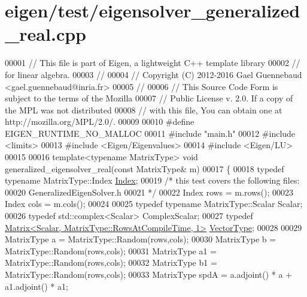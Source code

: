 \hypertarget{eigen_2test_2eigensolver__generalized__real_8cpp_source}{}\section{eigen/test/eigensolver\+\_\+generalized\+\_\+real.cpp}
\label{eigen_2test_2eigensolver__generalized__real_8cpp_source}

\begin{DoxyCode}
00001 \textcolor{comment}{// This file is part of Eigen, a lightweight C++ template library}
00002 \textcolor{comment}{// for linear algebra.}
00003 \textcolor{comment}{//}
00004 \textcolor{comment}{// Copyright (C) 2012-2016 Gael Guennebaud <gael.guennebaud@inria.fr>}
00005 \textcolor{comment}{//}
00006 \textcolor{comment}{// This Source Code Form is subject to the terms of the Mozilla}
00007 \textcolor{comment}{// Public License v. 2.0. If a copy of the MPL was not distributed}
00008 \textcolor{comment}{// with this file, You can obtain one at http://mozilla.org/MPL/2.0/.}
00009 
00010 \textcolor{preprocessor}{#define EIGEN\_RUNTIME\_NO\_MALLOC}
00011 \textcolor{preprocessor}{#include "main.h"}
00012 \textcolor{preprocessor}{#include <limits>}
00013 \textcolor{preprocessor}{#include <Eigen/Eigenvalues>}
00014 \textcolor{preprocessor}{#include <Eigen/LU>}
00015 
00016 \textcolor{keyword}{template}<\textcolor{keyword}{typename} MatrixType> \textcolor{keywordtype}{void} generalized\_eigensolver\_real(\textcolor{keyword}{const} MatrixType& m)
00017 \{
00018   \textcolor{keyword}{typedef} \textcolor{keyword}{typename} MatrixType::Index \hyperlink{namespace_eigen_a62e77e0933482dafde8fe197d9a2cfde}{Index};
00019   \textcolor{comment}{/* this test covers the following files:}
00020 \textcolor{comment}{     GeneralizedEigenSolver.h}
00021 \textcolor{comment}{  */}
00022   Index rows = m.rows();
00023   Index cols = m.cols();
00024 
00025   \textcolor{keyword}{typedef} \textcolor{keyword}{typename} MatrixType::Scalar Scalar;
00026   \textcolor{keyword}{typedef} std::complex<Scalar> ComplexScalar;
00027   \textcolor{keyword}{typedef} \hyperlink{group___core___module_class_eigen_1_1_matrix}{Matrix<Scalar, MatrixType::RowsAtCompileTime, 1>} 
      \hyperlink{struct_vector_type}{VectorType};
00028 
00029   MatrixType a = MatrixType::Random(rows,cols);
00030   MatrixType b = MatrixType::Random(rows,cols);
00031   MatrixType a1 = MatrixType::Random(rows,cols);
00032   MatrixType b1 = MatrixType::Random(rows,cols);
00033   MatrixType spdA =  a.adjoint() * a + a1.adjoint() * a1;

\end{DoxyCode}
